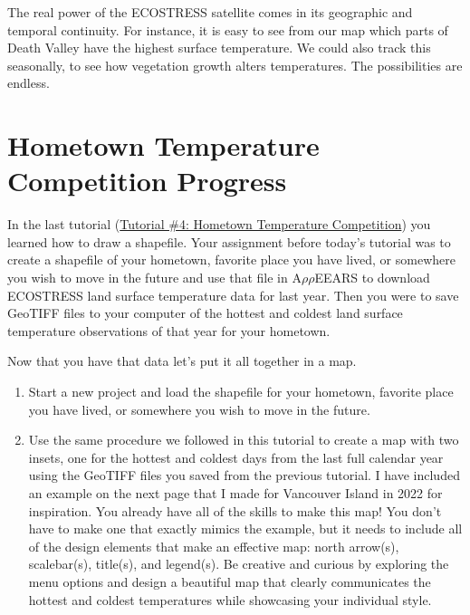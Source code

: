 \documentclass[oneside,a4paper,11pt,explicit]{book}
\begin{document}

The real power of the ECOSTRESS satellite comes in its geographic and temporal continuity. For instance, it is easy to see from our map which parts of Death Valley have the highest surface temperature. We could also track this seasonally, to see how vegetation growth alters temperatures. The possibilities are endless.

\section{Hometown Temperature Competition Progress}

In the last tutorial (\href{https://jeremydforsythe.github.io/icecream-tutorials/Tutorial4_TemperatureCompetition/Tutorial4_TemperatureCompetition.pdf}{Tutorial \#4: Hometown Temperature Competition}) you learned how to draw a shapefile. Your assignment before today's tutorial was to create a shapefile of your hometown, favorite place you have lived, or somewhere you wish to move in the future and use that file in A$\rho\rho$EEARS to download ECOSTRESS land surface temperature data for last year. Then you were to save GeoTIFF files to your computer of the hottest and coldest land surface temperature observations of that year for your hometown.

\begin{tcolorbox}[colback=yellow!5!white,colframe=IceCreamLeaf,title=\textbf{Temperature Competition Next Steps}]
	Now that you have that data let's put it all together in a map.
	\begin{enumerate}
		\item Start a new project and load the shapefile for your hometown, favorite place you have lived, or somewhere you wish to move in the future.
		\item Use the same procedure we followed in this tutorial to create a map with two insets, one for the hottest and coldest days from the last full calendar year using the GeoTIFF files you saved from the previous tutorial. I have included an example on the next page that I made for Vancouver Island in 2022 for inspiration. You already have all of the skills to make this map! You don't have to make one that exactly mimics the example, but it needs to include all of the design elements that make an effective map: north arrow(s), scalebar(s), title(s), and legend(s). Be creative and curious by exploring the menu options and design a beautiful map that clearly communicates the hottest and coldest temperatures while showcasing your individual style.
	\end{enumerate}
\end{tcolorbox}
\end{document}
